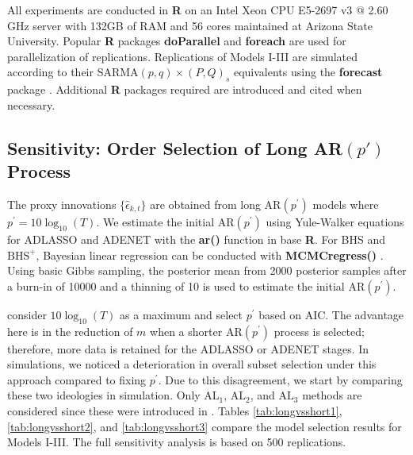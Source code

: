 All experiments are conducted in {\bf R} \citep{RCORETEAM} on an Intel Xeon CPU E5-2697 v3 @ 2.60 GHz server with 132GB of RAM and 56 cores maintained at Arizona State University. Popular {\bf R} packages {\bf doParallel} and {\bf foreach} are used for parallelization of replications. Replications of Models I-III are simulated according to their SARMA$(p,q)\times(P,Q)_s$ equivalents using the {\bf forecast} package  \citep{Hyndman2008}. Additional {\bf R} packages required are introduced and cited when necessary. %

\subsection{Sensitivity: Order Selection of Long AR$(p')$ Process}
The proxy innovations $\{\hat{\epsilon}_{k,t}\}$ are obtained from long AR$(p^\prime)$ models where $p^\prime=10\log_{10}(T)$.  We estimate the initial AR$(p^\prime)$ using Yule-Walker equations for ADLASSO and ADENET with the {\bf ar()} function in base {\bf R}. For BHS and $\textrm{BHS}^+$, Bayesian linear regression \citep[pg.354]{Gelman2014} can be conducted with  {\bf MCMCregress()} \citep{MCMCpack}. Using basic Gibbs sampling, the posterior mean from 2000 posterior samples after a burn-in of 10000 and a thinning of 10 is used to estimate the initial AR$(p^\prime)$. 

\cite{Chen2011} consider $10\log_{10}(T)$ as a maximum and select $p^\prime$ based on AIC. The advantage here is in the reduction of $m$ when a shorter AR$(p^\prime)$ process is selected; therefore, more data is retained for the ADLASSO or ADENET stages. In simulations, we noticed a deterioration in overall subset selection under this approach compared to fixing $p^\prime$. Due to this disagreement, we start by comparing these two ideologies in simulation. Only $\textrm{AL}_1$, $\textrm{AL}_2$, and $\textrm{AL}_3$ methods are considered since these were introduced in \cite{Chen2011}. Tables \ref{tab:longvsshort1}, \ref{tab:longvsshort2}, and \ref{tab:longvsshort3} compare the model selection results for Models I-III. The full sensitivity analysis is based on 500 replications.

